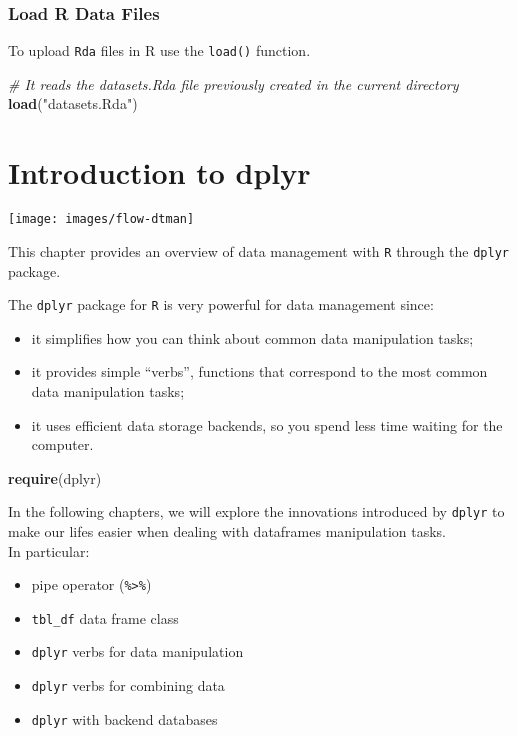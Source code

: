 \documentclass[]{book}
\newenvironment{Shaded}{\begin{snugshade}}{\end{snugshade}}
\newcommand{\KeywordTok}[1]{\textcolor[rgb]{0.13,0.29,0.53}{\textbf{{#1}}}}
\newcommand{\StringTok}[1]{\textcolor[rgb]{0.31,0.60,0.02}{{#1}}}
\newcommand{\CommentTok}[1]{\textcolor[rgb]{0.56,0.35,0.01}{\textit{{#1}}}}
\newcommand{\NormalTok}[1]{{#1}}
\providecommand{\tightlist}{%
  \setlength{\itemsep}{0pt}\setlength{\parskip}{0pt}}
\def\tightlist{}
\begin{document}
\subsection{Load R Data Files}\label{load-r-data-files}

To upload \texttt{Rda} files in R use the \texttt{load()} function.

\begin{Shaded}
\begin{Highlighting}[]
\CommentTok{# It reads the datasets.Rda file previously created in the current directory}
\KeywordTok{load}\NormalTok{(}\StringTok{"datasets.Rda"}\NormalTok{)}
\end{Highlighting}
\end{Shaded}

\chapter{Introduction to dplyr}\label{introduction-to-dplyr}

\texttt{[image: images/flow-dtman]}

This chapter provides an overview of data management with \texttt{R}
through the \texttt{dplyr} package.

The \texttt{dplyr} package for \texttt{R} is very powerful for data
management since:

\begin{itemize}
\tightlist
\item
  it simplifies how you can think about common data manipulation tasks;
\item
  it provides simple ``verbs'', functions that correspond to the most
  common data manipulation tasks;
\item
  it uses efficient data storage backends, so you spend less time
  waiting for the computer.
\end{itemize}

\begin{Shaded}
\begin{Highlighting}[]
\KeywordTok{require}\NormalTok{(dplyr)}
\end{Highlighting}
\end{Shaded}

In the following chapters, we will explore the innovations introduced by
\texttt{dplyr} to make our lifes easier when dealing with dataframes
manipulation tasks.\\
In particular:

\begin{itemize}
\tightlist
\item
  pipe operator (\texttt{\%\textgreater{}\%})
\item
  \texttt{tbl\_df} data frame class
\item
  \texttt{dplyr} verbs for data manipulation
\item
  \texttt{dplyr} verbs for combining data
\item
  \texttt{dplyr} with backend databases
\end{itemize}
\end{document}
